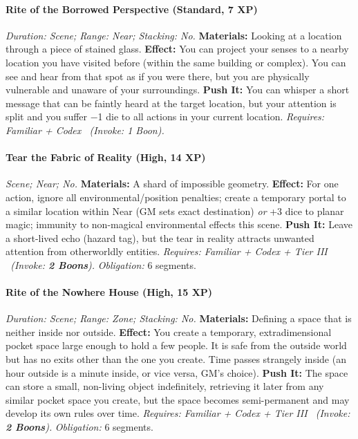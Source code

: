 \documentclass[12pt,twoside]{book}
\begin{document}
\paragraph{Rite of the Borrowed Perspective (Standard, 7 XP)} \emph{Duration: Scene; Range: Near; Stacking: No.}
\textbf{Materials:} Looking at a location through a piece of stained glass.
\textbf{Effect:} You can project your senses to a nearby location you have visited before (within the same building or complex). You can see and hear from that spot as if you were there, but you are physically vulnerable and unaware of your surroundings.
\textbf{Push It:} You can whisper a short message that can be faintly heard at the target location, but your attention is split and you suffer −1 die to all actions in your current location.
\emph{Requires: Familiar + Codex \ (\textit{Invoke:} 1 Boon).}
\paragraph{Tear the Fabric of Reality (High, 14 XP)} \emph{Scene; Near; No.}
\textbf{Materials:} A shard of impossible geometry.
\textbf{Effect:} For one action, ignore all environmental/position penalties; create a temporary portal to a similar location within Near (GM sets exact destination) \emph{or} +3 dice to planar magic; immunity to non-magical environmental effects this scene.
\textbf{Push It:} Leave a short-lived echo (hazard tag), but the tear in reality attracts unwanted attention from otherworldly entities.
\emph{Requires: Familiar + Codex + Tier III \ (\textit{Invoke:} \textbf{2 Boons}).}
\emph{Obligation:} 6 segments.

\paragraph{Rite of the Nowhere House (High, 15 XP)} \emph{Duration: Scene; Range: Zone; Stacking: No.}
\textbf{Materials:} Defining a space that is neither inside nor outside.
\textbf{Effect:} You create a temporary, extradimensional pocket space large enough to hold a few people. It is safe from the outside world but has no exits other than the one you create. Time passes strangely inside (an hour outside is a minute inside, or vice versa, GM's choice).
\textbf{Push It:} The space can store a small, non-living object indefinitely, retrieving it later from any similar pocket space you create, but the space becomes semi-permanent and may develop its own rules over time.
\emph{Requires: Familiar + Codex + Tier III \ (\textit{Invoke:} \textbf{2 Boons}).}
\emph{Obligation:} 6 segments.
\end{document}
